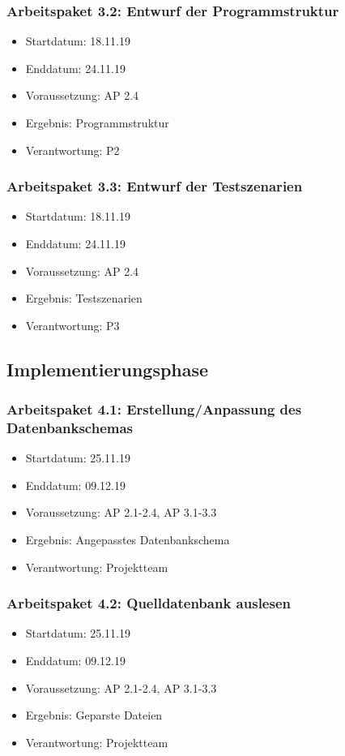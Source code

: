 \subsubsection*{Arbeitspaket 3.2: Entwurf der Programmstruktur}
\begin{itemize}
\item Startdatum: 18.11.19
\item Enddatum: 24.11.19
\item Voraussetzung: AP 2.4
\item Ergebnis: Programmstruktur
\item Verantwortung: P2
\end{itemize}
\subsubsection*{Arbeitspaket 3.3: Entwurf der Testszenarien}
\begin{itemize}
\item Startdatum: 18.11.19
\item Enddatum: 24.11.19
\item Voraussetzung: AP 2.4
\item Ergebnis: Testszenarien
\item Verantwortung: P3
\end{itemize}
\subsection*{Implementierungsphase}
\subsubsection*{Arbeitspaket 4.1: Erstellung/Anpassung des Datenbankschemas}
\begin{itemize}
\item Startdatum: 25.11.19
\item Enddatum: 09.12.19
\item Voraussetzung: AP 2.1-2.4, AP 3.1-3.3
\item Ergebnis: Angepasstes Datenbankschema
\item Verantwortung: Projektteam
\end{itemize}
\subsubsection*{Arbeitspaket 4.2: Quelldatenbank auslesen}
\begin{itemize}
\item Startdatum: 25.11.19
\item Enddatum: 09.12.19
\item Voraussetzung: AP 2.1-2.4, AP 3.1-3.3
\item Ergebnis: Geparste Dateien
\item Verantwortung: Projektteam
\end{itemize}
